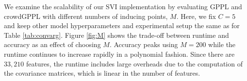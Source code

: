 
We examine the scalability of our SVI implementation by evaluating GPPL and crowdGPPL with
different numbers of inducing points, $M$. Here, we fix $C=5$ and keep other model hyperparameters 
and experimental setup the same as for Table \ref{tab:convarg}. 
Figure \ref{fig:M} shows the trade-off between
runtime and accuracy as an effect of choosing $M$. Accuracy peaks
using $M=200$ while the runtime continues to increase rapidly in a polynomial fashion.
Since there are $33,210$ features, the runtime includes large overheads due to the computation of
the covariance matrices, which is linear in the number of features. 

